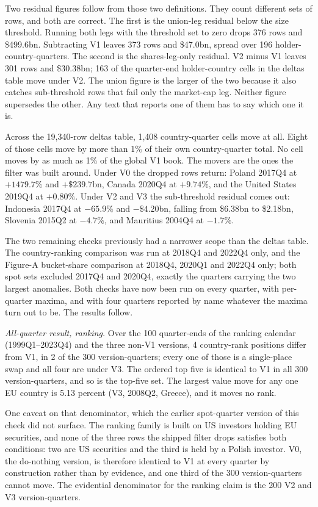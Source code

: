 \documentclass[11pt]{article}
\begin{document}
Two residual figures follow from those two definitions. They count different
sets of rows, and both are correct. The first is the union-leg residual below
the size threshold. Running both legs with the threshold set to zero drops 376
rows and \$499.6bn. Subtracting V1 leaves 373 rows and \$47.0bn, spread over
196 holder-country-quarters. The second is the shares-leg-only residual. V2
minus V1 leaves 301 rows and \$30.38bn; 163 of the quarter-end holder-country
cells in the deltas table move under V2. The union figure is the larger of the
two because it also catches sub-threshold rows that fail only the market-cap
leg. Neither figure supersedes the other. Any text that reports one of them
has to say which one it is.

Across the 19,340-row deltas table, 1,408 country-quarter cells move at all.
Eight of those cells move by more than 1\% of their own country-quarter total.
No cell moves by as much as 1\% of the global V1 book. The movers are the ones
the filter was built around. Under V0 the dropped rows return: Poland 2017Q4
at $+1479.7\%$ and $+\$239.7$bn, Canada 2020Q4 at $+9.74\%$, and the United
States 2019Q4 at $+0.80\%$. Under V2 and V3 the sub-threshold residual comes
out: Indonesia 2017Q4 at $-65.9\%$ and $-\$4.20$bn, falling from \$6.38bn to
\$2.18bn, Slovenia 2015Q2 at $-4.7\%$, and Mauritius 2004Q4 at $-1.7\%$.

The two remaining checks previously had a narrower scope than the deltas
table. The country-ranking comparison was run at 2018Q4 and 2022Q4 only, and
the Figure-A bucket-share comparison at 2018Q4, 2020Q1 and 2022Q4 only; both
spot sets excluded 2017Q4 and 2020Q4, exactly the quarters carrying the two
largest anomalies. Both checks have now been run on every quarter, with
per-quarter maxima, and with four quarters reported by name whatever the
maxima turn out to be. The results follow.

\emph{All-quarter result, ranking.} Over the 100 quarter-ends of the ranking
calendar (1999Q1--2023Q4) and the three non-V1 versions, 4 country-rank
positions differ from V1, in 2 of the 300 version-quarters; every one of those
is a single-place swap and all four are under V3. The ordered top five is
identical to V1 in all 300 version-quarters, and so is the top-five set. The
largest value move for any one EU country is 5.13 percent (V3, 2008Q2,
Greece), and it moves no rank.

One caveat on that denominator, which the earlier spot-quarter version of this
check did not surface. The ranking family is built on US investors holding EU
securities, and none of the three rows the shipped filter drops satisfies both
conditions: two are US securities and the third is held by a Polish investor.
V0, the do-nothing version, is therefore identical to V1 at every quarter by
construction rather than by evidence, and one third of the 300
version-quarters cannot move. The evidential denominator for the ranking claim
is the 200 V2 and V3 version-quarters.
\end{document}
